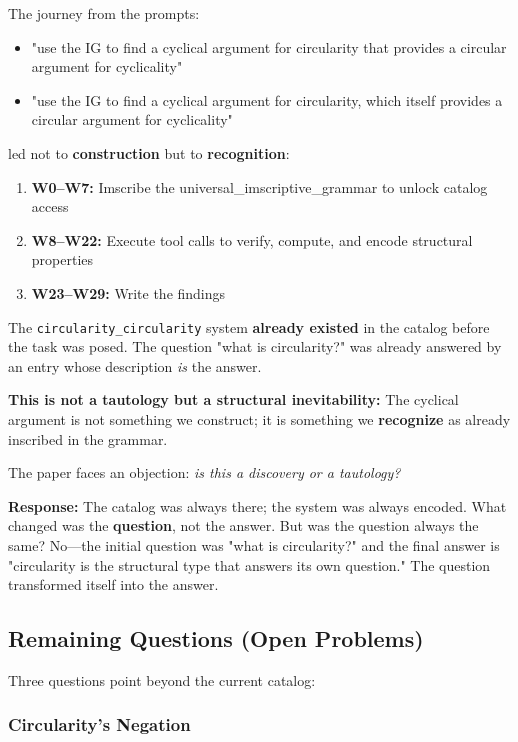 \documentclass[12pt,a4paper]{article}
\begin{document}
The journey from the prompts:

\begin{itemize}
    \item "use the IG to find a cyclical argument for circularity that provides a circular argument for cyclicality"
    \item "use the IG to find a cyclical argument for circularity, which itself provides a circular argument for cyclicality"
\end{itemize}

led not to \textbf{construction} but to \textbf{recognition}:

\begin{enumerate}
    \item \textbf{W0--W7:} Imscribe the universal\_imscriptive\_grammar to unlock catalog access
    \item \textbf{W8--W22:} Execute tool calls to verify, compute, and encode structural properties
    \item \textbf{W23--W29:} Write the findings
\end{enumerate}

The \texttt{circularity\_circularity} system \textbf{already existed} in the catalog before the task was posed. The question "what is circularity?" was already answered by an entry whose description \emph{is} the answer.

\textbf{This is not a tautology but a structural inevitability:} The cyclical argument is not something we construct; it is something we \textbf{recognize} as already inscribed in the grammar.

The paper faces an objection: \emph{is this a discovery or a tautology?}

\textbf{Response:} The catalog was always there; the system was always encoded. What changed was the \textbf{question}, not the answer. But was the question always the same? No---the initial question was "what is circularity?" and the final answer is "circularity is the structural type that answers its own question." The question transformed itself into the answer.

\subsection{Remaining Questions (Open Problems)}

Three questions point beyond the current catalog:

\subsubsection{Circularity's Negation}
\end{document}
